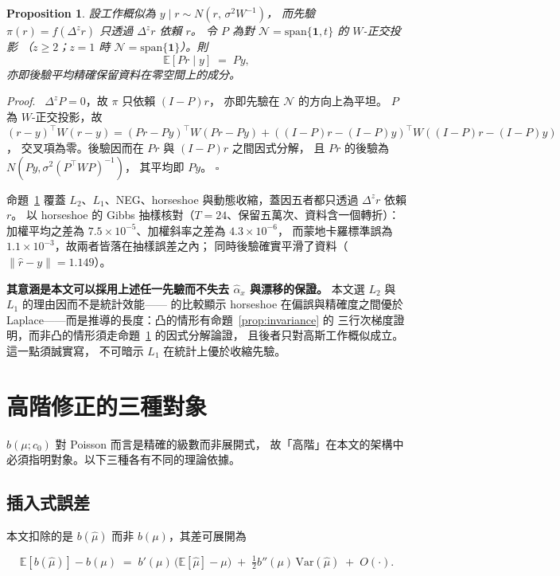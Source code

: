 \documentclass[UTF8, fontset=macnew, a4paper, 12pt]{ctexart}
\newtheorem{prop}{Proposition}
\newenvironment{proof}{\par\noindent\textit{Proof}.\ }{\hfill$\square$\par\vspace{4pt}}
\newcommand{\Ex}{\mathbb{E}}
\begin{document}
\begin{prop}\label{prop:shrink}
設工作概似為 $y\mid r\sim N(r,\,\sigma^2W^{-1})$，
而先驗 $\pi(r)=f(\Delta^{z}r)$ 只透過 $\Delta^{z}r$ 依賴 $r$。
令 $P$ 為對 $\mathcal N=\mathrm{span}\{\mathbf 1,t\}$ 的 $W$-正交投影
（$z\ge2$；$z=1$ 時 $\mathcal N=\mathrm{span}\{\mathbf 1\}$）。則
$$\Ex[Pr\mid y]\;=\;Py ,$$
亦即後驗平均精確保留資料在零空間上的成分。
\end{prop}

\begin{proof}
$\Delta^{z}P=0$，故 $\pi$ 只依賴 $(I-P)r$，
亦即先驗在 $\mathcal N$ 的方向上為平坦。
$P$ 為 $W$-正交投影，故
$(r-y)^{\top}W(r-y)=(Pr-Py)^{\top}W(Pr-Py)
+((I-P)r-(I-P)y)^{\top}W((I-P)r-(I-P)y)$，
交叉項為零。後驗因而在 $Pr$ 與 $(I-P)r$ 之間因式分解，
且 $Pr$ 的後驗為 $N(Py,\sigma^2(P^{\top}WP)^{-1})$，
其平均即 $Py$。
\end{proof}

命題~\ref{prop:shrink} 覆蓋 $L_2$、$L_1$、NEG、horseshoe
與動態收縮，蓋因五者都只透過 $\Delta^{z}r$ 依賴 $r$。
以 horseshoe 的 Gibbs 抽樣核對（$T=24$、保留五萬次、資料含一個轉折）：
加權平均之差為 $7.5\times10^{-5}$、加權斜率之差為 $4.3\times10^{-6}$，
而蒙地卡羅標準誤為 $1.1\times10^{-3}$，故兩者皆落在抽樣誤差之內；
同時後驗確實平滑了資料（$\|\hat r-y\|=1.149$）。

\textbf{其意涵是本文可以採用上述任一先驗而不失去
$\hat\alpha_x$ 與漂移的保證。} 本文選 $L_2$ 與 $L_1$ 的理由因而不是統計效能——
\citet{faulkner2018} 的比較顯示 horseshoe 在偏誤與精確度之間優於
Laplace——而是推導的長度：凸的情形有命題~\ref{prop:invariance} 的
三行次梯度證明，而非凸的情形須走命題~\ref{prop:shrink} 的因式分解論證，
且後者只對高斯工作概似成立。這一點須誠實寫，
不可暗示 $L_1$ 在統計上優於收縮先驗。

\section{高階修正的三種對象}\label{sec:higher}

$b(\mu;c_0)$ 對 Poisson 而言是精確的級數而非展開式，
故「高階」在本文的架構中必須指明對象。以下三種各有不同的理論依據。

\subsection{插入式誤差}\label{subsec:plugin}

本文扣除的是 $b(\hat\mu)$ 而非 $b(\mu)$，其差可展開為

\begin{equation}\label{eq:plugin}
\Ex[b(\hat\mu)]-b(\mu)\;=\;b'(\mu)\,\big(\Ex[\hat\mu]-\mu\big)
\;+\;\tfrac12 b''(\mu)\,\mathrm{Var}(\hat\mu)\;+\;O(\cdot).
\end{equation}
\end{document}
